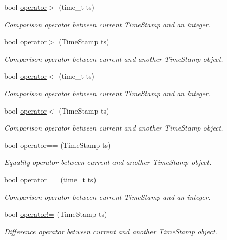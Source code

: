 \begin{CompactItemize}
bool \hyperlink{classTimeStamp_TimeStampa6}{operator$>$} (time\_\-t ts)
\begin{CompactList}\small\item\em Comparison operator between current Time\-Stamp and an integer.\item\end{CompactList}\item 
bool \hyperlink{classTimeStamp_TimeStampa7}{operator$>$} (Time\-Stamp ts)
\begin{CompactList}\small\item\em Comparison operator between current and another Time\-Stamp object.\item\end{CompactList}\item 
bool \hyperlink{classTimeStamp_TimeStampa8}{operator$<$} (time\_\-t ts)
\begin{CompactList}\small\item\em Comparison operator between current Time\-Stamp and an integer.\item\end{CompactList}\item 
bool \hyperlink{classTimeStamp_TimeStampa9}{operator$<$} (Time\-Stamp ts)
\begin{CompactList}\small\item\em Comparison operator between current and another Time\-Stamp object.\item\end{CompactList}\item 
bool \hyperlink{classTimeStamp_TimeStampa10}{operator==} (Time\-Stamp ts)
\begin{CompactList}\small\item\em Equality operator between current and another Time\-Stamp object.\item\end{CompactList}\item 
bool \hyperlink{classTimeStamp_TimeStampa11}{operator==} (time\_\-t ts)
\begin{CompactList}\small\item\em Comparison operator between current Time\-Stamp and an integer.\item\end{CompactList}\item 
bool \hyperlink{classTimeStamp_TimeStampa12}{operator!=} (Time\-Stamp ts)
\begin{CompactList}\small\item\em Difference operator between current and another Time\-Stamp object.\item\end{CompactList}\item 

\end{CompactItemize}
